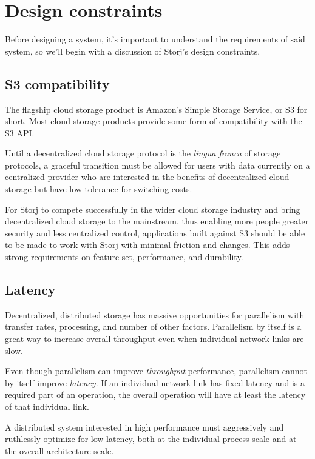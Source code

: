 \documentclass[a4paper,10pt]{article}
\begin{document}
\section{Design constraints}

Before designing a system, it's important to understand the requirements of
said system, so we'll begin with a discussion of Storj's design constraints.

\subsection{S3 compatibility}

The flagship cloud storage product is Amazon's Simple Storage Service, or S3
for short. Most cloud storage products provide some form of compatibility with
the S3 API.

Until a decentralized cloud storage protocol is the {\em lingua franca} of
storage protocols, a graceful transition must be allowed for users with data
currently on a centralized provider who are interested in the benefits of
decentralized cloud storage but have low tolerance for switching costs.

For Storj to compete successfully in the wider cloud storage industry and bring
decentralized cloud storage to the mainstream, thus enabling more people
greater security and less centralized control, applications built against S3
should be able to be made to work with Storj with minimal friction and changes.
This adds strong requirements on feature set, performance, and durability.

\subsection{Latency}

Decentralized, distributed storage has massive opportunities for parallelism
with transfer rates, processing, and number of other factors. Parallelism by
itself is a great way to increase overall throughput even when individual
network links are slow.

Even though parallelism can improve {\em throughput} performance, parallelism
cannot by itself improve {\em latency}. If an individual network link has fixed
latency and is a required part of an operation, the overall operation will
have at least the latency of that individual link.

A distributed system interested in high performance must aggressively and
ruthlessly optimize for low latency, both at the individual process scale and
at the overall architecture scale.
\end{document}
